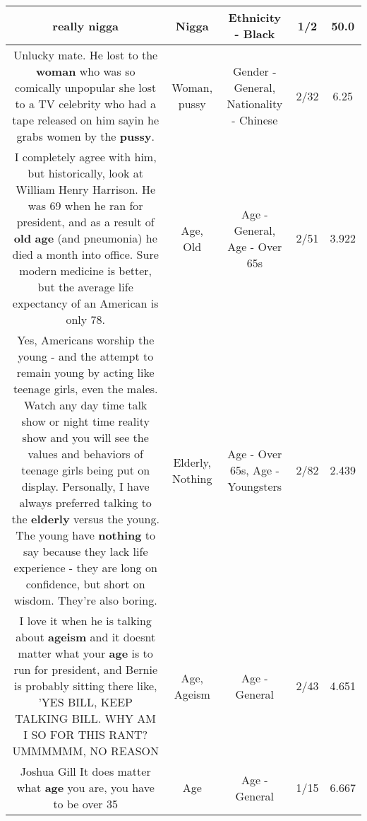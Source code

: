 \documentclass[11pt]{article}
\newlength\mylength
\begin{document}
\begin{center}
\begin{longtable}{|C{.65\mylength}|C{.30\mylength}|C{.12\mylength}|C{.12\mylength}|C{.12\mylength}|}
  \small really nigga\normalsize   & Nigga & Ethnicity - Black & 1/2 & 50.0 \\  \hline
  \small Unlucky mate. He lost to the \textbf{woman} who was so comically unpopular she lost to a TV celebrity who had a tape released on him sayin he grabs women by the \textbf{pussy}.\normalsize   & Woman, pussy & Gender - General, Nationality - Chinese & 2/32 & 6.25 \\  \hline
  \small I completely agree with him, but historically, look at William Henry Harrison. He was 69 when he ran for president, and as a result of \textbf{old} \textbf{age} (and pneumonia) he died a month into office. Sure modern medicine is better, but the average life expectancy of an American is only 78.\normalsize   & Age, Old & Age - General, Age - Over 65s & 2/51 & 3.922 \\  \hline
  \small Yes, Americans worship the young - and the attempt to remain young by acting like teenage girls, even the males. Watch any day time talk show or night time reality show and you will see the values and behaviors of teenage girls being put on display. Personally, I have always preferred talking to the \textbf{elderly} versus the young. The young have \textbf{nothing} to say because they lack life experience - they are long on confidence, but short on wisdom. They're also boring.\normalsize   & Elderly, Nothing & Age - Over 65s, Age - Youngsters & 2/82 & 2.439 \\  \hline
  \small I love it when he is talking about \textbf{ageism} and it doesnt matter what your \textbf{age} is to run for president, and Bernie is probably sitting there like, 'YES BILL, KEEP TALKING BILL.  WHY AM I SO FOR THIS RANT? UMMMMMM, NO REASON\normalsize   & Age, Ageism & Age - General & 2/43 & 4.651 \\  \hline
  \small Joshua Gill It does matter what \textbf{age} you are, you have to be over 35\normalsize   & Age & Age - General & 1/15 & 6.667 \\  \hline

\end{longtable}
\end{center}
\end{document}
